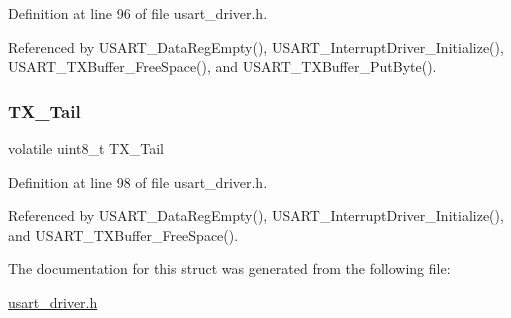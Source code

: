 Definition at line 96 of file usart\+\_\+driver.\+h.



Referenced by U\+S\+A\+R\+T\+\_\+\+Data\+Reg\+Empty(), U\+S\+A\+R\+T\+\_\+\+Interrupt\+Driver\+\_\+\+Initialize(), U\+S\+A\+R\+T\+\_\+\+T\+X\+Buffer\+\_\+\+Free\+Space(), and U\+S\+A\+R\+T\+\_\+\+T\+X\+Buffer\+\_\+\+Put\+Byte().

\hypertarget{struct_u_s_a_r_t___buffer_ab4c125e286a5f36c1f44256fd35eb66d}{}\label{struct_u_s_a_r_t___buffer_ab4c125e286a5f36c1f44256fd35eb66d} 
\subsubsection{\texorpdfstring{T\+X\+\_\+\+Tail}{TX\_Tail}}
{\footnotesize\ttfamily volatile uint8\+\_\+t T\+X\+\_\+\+Tail}



Definition at line 98 of file usart\+\_\+driver.\+h.



Referenced by U\+S\+A\+R\+T\+\_\+\+Data\+Reg\+Empty(), U\+S\+A\+R\+T\+\_\+\+Interrupt\+Driver\+\_\+\+Initialize(), and U\+S\+A\+R\+T\+\_\+\+T\+X\+Buffer\+\_\+\+Free\+Space().



The documentation for this struct was generated from the following file\+:\begin{DoxyCompactItemize}
\item 
\hyperlink{usart__driver_8h}{usart\+\_\+driver.\+h}\end{DoxyCompactItemize}
